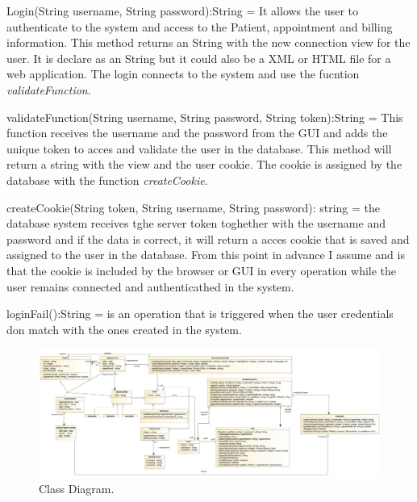 \documentclass{article}
\begin{document}
            Login(String username, String password):String = It allows the user to authenticate to the system and access to the Patient, appointment and billing information. This method returns an String with the new connection view for the user. It is declare as an
            String but it could also be a XML or HTML file for a web application. The login connects to the system and use the fucntion \textit{validateFunction}.

            validateFunction(String username, String password, String token):String = This function receives the username and the password from the GUI and adds the unique token to acces and validate the user in the database. This method will return a string with the view and the
            user cookie. The cookie is assigned by the database with the function \textit{createCookie}.

            createCookie(String token, String username, String password): string =  the database system receives tghe server token toghether with the username and password and if the data is correct, it will return a acces cookie that is saved and assigned to the user in the database.
            From this point in advance I assume and is that the cookie is included by the browser or GUI in every operation while the user remains connected and authenticathed in the system.

            loginFail():String =  is an operation that is triggered when the user credentials don match with the ones created in the system.
            
            \begin{figure}[H]
                \centering 
                \includegraphics[width=1\linewidth]{./img/class.png}
                \caption{Class Diagram.}
                \label{fig:class}
            \end{figure}
\end{document}
